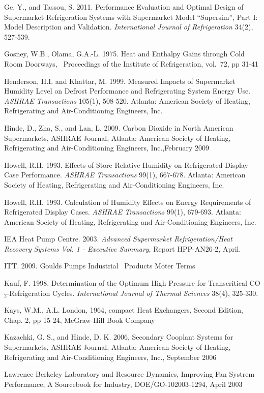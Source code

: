 Ge, Y., and Tassou, S. 2011. Performance Evaluation and Optimal Design of Supermarket Refrigeration Systems with Supermarket Model ``Supersim'', Part I: Model Description and Validation. \emph{International Journal of Refrigeration} 34(2), 527-539.

Gosney, W.B., Olama, G.A.-L. 1975. Heat and Enthalpy Gains through Cold Room Doorways,~ Proceedings of the Institute of Refrigeration, vol.~72, pp 31-41

Henderson, H.I. and Khattar, M. 1999. Measured Impacts of Supermarket Humidity Level on Defrost Performance and Refrigerating System Energy Use. \emph{ASHRAE Transactions} 105(1), 508-520. Atlanta: American Society of Heating, Refrigerating and Air-Conditioning Engineers, Inc.

Hinde, D., Zha, S., and Lan, L. 2009. Carbon Dioxide in North American Supermarkets, ASHRAE Journal, Atlanta: American Society of Heating, Refrigerating and Air-Conditioning Engineers, Inc.,February 2009

Howell, R.H. 1993. Effects of Store Relative Humidity on Refrigerated Display Case Performance. \emph{ASHRAE Transactions} 99(1), 667-678. Atlanta: American Society of Heating, Refrigerating and Air-Conditioning Engineers, Inc.

Howell, R.H. 1993. Calculation of Humidity Effects on Energy Requirements of Refrigerated Display Cases. \emph{ASHRAE Transactions} 99(1), 679-693. Atlanta: American Society of Heating, Refrigerating and Air-Conditioning Engineers, Inc.

IEA Heat Pump Centre. 2003. \emph{Advanced Supermarket Refrigeration/Heat Recovery Systems Vol. 1 - Executive Summary}, Report HPP-AN26-2, April.

ITT. 2009. Goulds Pumps Industrial~ Products Moter Terms

Kauf, F. 1998. Determination of the Optimum High Pressure for Transcritical CO\(_{2}\)-Refrigeration Cycles. \emph{International Journal of Thermal Sciences} 38(4), 325-330.

Kays, W.M., A.L. London, 1964, compact Heat Exchangers, Second Edition, Chap. 2, pp 15-24, McGraw-Hill Book Company

Kazachki, G. S., and Hinde, D. K. 2006, Secondary Cooplant Systems for Supermarkets, ASHRAE Journal, Atlanta: American Society of Heating, Refrigerating and Air-Conditioning Engineers, Inc., September 2006

Lawrence Berkeley Laboratory and Resource Dynamics, Improving Fan Systrem Performance, A Sourcebook for Industry, DOE/GO-102003-1294, April 2003

